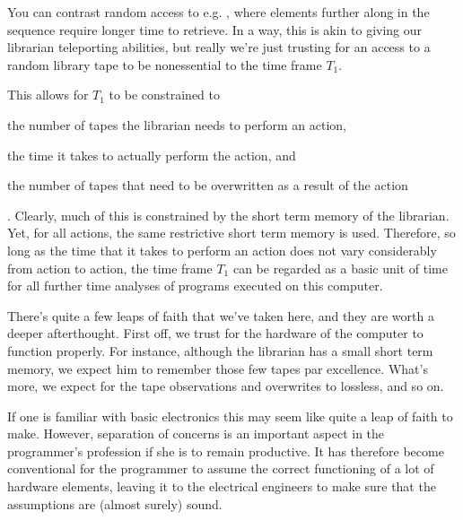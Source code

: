 You can contrast random access to e.g. , where elements
further along in the sequence require longer time to retrieve. In a way, this
is akin to giving our librarian teleporting abilities, but really we're just
trusting for an access to a random library tape to be nonessential to the time
frame $T_1$. 

This allows for $T_1$ to be constrained to \begin{inparaenum}[(1)] \item the
number of tapes the librarian needs to perform an action, \item the time it
takes to actually perform the action, and \item the number of tapes that need
to be overwritten as a result of the action\end{inparaenum}. Clearly, much of
this is constrained by the short term memory of the librarian.  Yet, for all
actions, the same restrictive short term memory is used.  Therefore, so long as
the time that it takes to perform an action does not vary considerably from
action to action, the time frame $T_1$ can be regarded as a basic unit of time
for all further time analyses of programs executed on this computer. 


There's quite a few leaps of faith that we've taken here, and they are worth a
deeper afterthought. First off, we trust for the hardware of the computer to
function properly. For instance, although the librarian has a small short term
memory, we expect him to remember those few tapes par excellence. What's more,
we expect for the tape observations and overwrites to lossless, and so on.

If one is familiar with basic electronics this may seem like quite a leap of
faith to make. However, separation of concerns is an important aspect in the
programmer's profession if she is to remain productive. It has therefore become
conventional for the programmer to assume the correct functioning of a lot of
hardware elements, leaving it to the electrical engineers to make sure that the
assumptions are (almost surely) sound.

